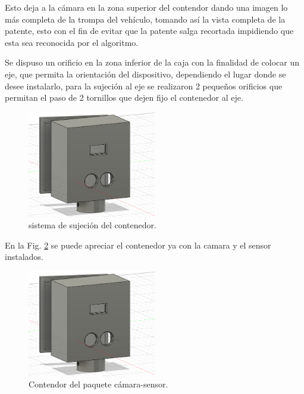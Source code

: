 Esto deja a la cámara en la zona superior del contendor dando una imagen lo más completa de la trompa del vehículo, tomando así la vista 
completa de la patente, esto con el fin de evitar que la patente salga recortada impidiendo que esta sea reconocida por el algoritmo.

Se dispuso un orificio en la zona inferior de la caja con la finalidad de colocar un eje, que permita la orientación del dispositivo, dependiendo 
el lugar donde se desee instalarlo, para la sujeción al eje se realizaron 2 pequeños orificios que permitan el paso de 2 tornillos que dejen fijo
el contenedor al eje.
\begin{figure}
    \centering
    \includegraphics[width=0.5\textwidth]{imgs/contenedor-camara.png}
    \caption{sistema de sujeción del contenedor.}
    \label{fig:sujecion-contenedor}
\end{figure}

En la Fig. \ref{fig:contenedor-camara-real} se puede apreciar el contenedor ya con la camara y el sensor instalados.

\begin{figure}
    \centering
    \includegraphics[width=0.5\textwidth]{imgs/contenedor-camara.png}
    \caption{Contendor del paquete cámara-sensor.}
    \label{fig:contenedor-camara-real}
\end{figure}

